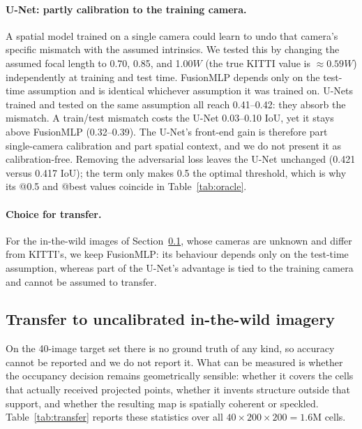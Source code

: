 \documentclass[sigconf]{acmart}
\newenvironment{revised}{\color{revcolor}}{}
\begin{document}
\begin{revised}
\paragraph{U-Net: partly calibration to the training camera.} A spatial model trained on a single camera could learn to undo that camera's specific mismatch with the assumed intrinsics. We tested this by changing the assumed focal length to 0.70, 0.85, and 1.00$W$ (the true KITTI value is $\approx 0.59W$) independently at training and test time. FusionMLP depends only on the test-time assumption and is identical whichever assumption it was trained on. U-Nets trained and tested on the same assumption all reach 0.41--0.42: they absorb the mismatch. A train/test mismatch costs the U-Net 0.03--0.10 IoU, yet it stays above FusionMLP (0.32--0.39). The U-Net's front-end gain is therefore part single-camera calibration and part spatial context, and we do not present it as calibration-free. Removing the adversarial loss leaves the U-Net unchanged (0.421 versus 0.417 IoU); the term only makes 0.5 the optimal threshold, which is why its @0.5 and @best values coincide in Table~\ref{tab:oracle}.

\paragraph{Choice for transfer.} For the in-the-wild images of Section~\ref{sec:transfer}, whose cameras are unknown and differ from KITTI's, we keep FusionMLP: its behaviour depends only on the test-time assumption, whereas part of the U-Net's advantage is tied to the training camera and cannot be assumed to transfer.
\end{revised}

\subsection{Transfer to uncalibrated in-the-wild imagery}\label{sec:transfer}

On the 40-image target set there is no ground truth of any kind, so accuracy cannot be reported and we do not report it. What can be measured is whether the occupancy decision remains geometrically sensible: whether it covers the cells that actually received projected points, whether it invents structure outside that support, and whether the resulting map is spatially coherent or speckled. Table~\ref{tab:transfer} reports these statistics over all $40 \times 200 \times 200 = 1.6$M cells.
\end{document}
